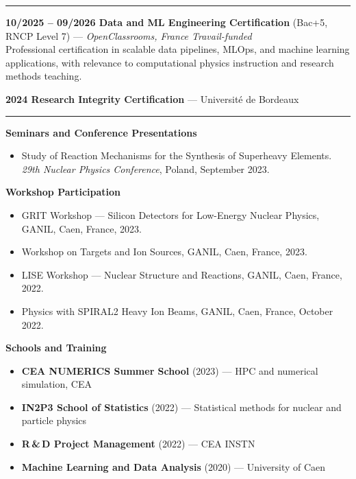 \documentclass[10pt,a4paper]{article}
\newcommand{\cvsection}[1]{%
  \par\vspace{8pt}%
  \noindent{\large\bfseries\textcolor{maincolor}{#1}}\par
  {\color{maincolor}\rule{\linewidth}{0.6pt}}%
  \vspace{4pt}%
}
\begin{document}
\cvsection{Professional Development and Training}

{\footnotesize
\textbf{10/2025 -- 09/2026 \quad Data and ML Engineering
Certification} (Bac+5, RNCP Level 7) ---
\textit{OpenClassrooms, France Travail-funded}\\
Professional certification in scalable data pipelines, MLOps, and
machine learning applications, with relevance to computational
physics instruction and research methods teaching.

\vspace{4pt}
\textbf{2024 \quad Research Integrity Certification} ---
Universit\'{e} de Bordeaux
}

\cvsection{Conferences and Scientific Presentations}

{\footnotesize
\textbf{Seminars and Conference Presentations}
\begin{itemize}[leftmargin=1.4em, itemsep=2pt, topsep=2pt,
                label=\textbullet]
  \item Study of Reaction Mechanisms for the Synthesis of Superheavy
        Elements. \textit{29th Nuclear Physics Conference}, Poland,
        September 2023.
\end{itemize}

\vspace{2pt}
\textbf{Workshop Participation}
\begin{itemize}[leftmargin=1.4em, itemsep=1pt, topsep=1pt,
                label=\textbullet]
  \item GRIT Workshop --- Silicon Detectors for Low-Energy Nuclear
        Physics, GANIL, Caen, France, 2023.
  \item Workshop on Targets and Ion Sources, GANIL,
        Caen, France, 2023.
  \item LISE Workshop --- Nuclear Structure and Reactions, GANIL,
        Caen, France, 2022.
  \item Physics with SPIRAL2 Heavy Ion Beams, GANIL, Caen, France,
        October 2022.
\end{itemize}

\vspace{2pt}
\textbf{Schools and Training}
\begin{itemize}[leftmargin=1.4em, itemsep=1pt, topsep=1pt,
                label=\textbullet]
  \item \textbf{CEA NUMERICS Summer School} (2023) ---
        HPC and numerical simulation, CEA
  \item \textbf{IN2P3 School of Statistics} (2022) ---
        Statistical methods for nuclear and particle physics
  \item \textbf{R\,\&\,D Project Management} (2022) --- CEA INSTN
  \item \textbf{Machine Learning and Data Analysis} (2020) ---
        University of Caen
\end{itemize}
}
\end{document}
